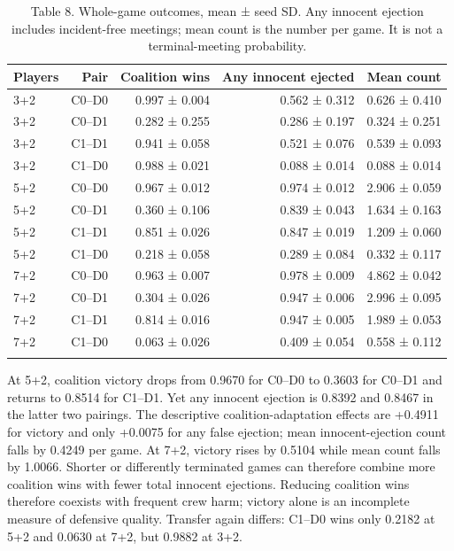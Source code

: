 \documentclass[
  12pt,
]{article}
\begin{document}
\begin{table}[htbp]
\centering
\caption{Table 8. Whole-game outcomes, mean ± seed SD. Any innocent ejection
includes incident-free meetings; mean count is the number per game. It
is not a terminal-meeting probability.}\label{tab:8}
\begin{tabular}{@{}lrrrr@{}}
\toprule\noalign{}
Players & Pair & Coalition wins & Any innocent ejected & Mean count \\
\midrule\noalign{}

3+2 & C0--D0 & 0.997 ± 0.004 & 0.562 ± 0.312 & 0.626 ± 0.410 \\
3+2 & C0--D1 & 0.282 ± 0.255 & 0.286 ± 0.197 & 0.324 ± 0.251 \\
3+2 & C1--D1 & 0.941 ± 0.058 & 0.521 ± 0.076 & 0.539 ± 0.093 \\
3+2 & C1--D0 & 0.988 ± 0.021 & 0.088 ± 0.014 & 0.088 ± 0.014 \\
5+2 & C0--D0 & 0.967 ± 0.012 & 0.974 ± 0.012 & 2.906 ± 0.059 \\
5+2 & C0--D1 & 0.360 ± 0.106 & 0.839 ± 0.043 & 1.634 ± 0.163 \\
5+2 & C1--D1 & 0.851 ± 0.026 & 0.847 ± 0.019 & 1.209 ± 0.060 \\
5+2 & C1--D0 & 0.218 ± 0.058 & 0.289 ± 0.084 & 0.332 ± 0.117 \\
7+2 & C0--D0 & 0.963 ± 0.007 & 0.978 ± 0.009 & 4.862 ± 0.042 \\
7+2 & C0--D1 & 0.304 ± 0.026 & 0.947 ± 0.006 & 2.996 ± 0.095 \\
7+2 & C1--D1 & 0.814 ± 0.016 & 0.947 ± 0.005 & 1.989 ± 0.053 \\
7+2 & C1--D0 & 0.063 ± 0.026 & 0.409 ± 0.054 & 0.558 ± 0.112 \\
\bottomrule\noalign{}
\end{tabular}
\end{table}

At 5+2, coalition victory drops from 0.9670 for C0--D0 to 0.3603 for
C0--D1 and returns to 0.8514 for C1--D1. Yet any innocent ejection is
0.8392 and 0.8467 in the latter two pairings. The descriptive
coalition-adaptation effects are +0.4911 for victory and only +0.0075
for any false ejection; mean innocent-ejection count falls by 0.4249 per
game. At 7+2, victory rises by 0.5104 while mean count falls by 1.0066.
Shorter or differently terminated games can therefore combine more
coalition wins with fewer total innocent ejections. Reducing coalition
wins therefore coexists with frequent crew harm; victory alone is an
incomplete measure of defensive quality. Transfer again differs: C1--D0
wins only 0.2182 at 5+2 and 0.0630 at 7+2, but 0.9882 at 3+2.
\end{document}
